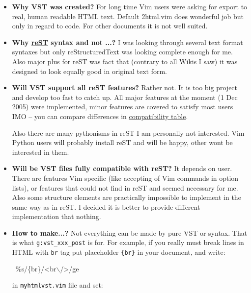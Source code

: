 \documentclass[12pt]{article}
\begin{document}
\begin{itemize}
\item
\textbf{Why VST was created?} For long time Vim users were asking for export
to real, human readable HTML text. Default 2html.vim does wonderful job but
only in regard to code. For other documents it is not well suited.

\item
\textbf{Why \href{http://docutils.sf.net}{reST} syntax and not ...?} I was looking through several text format
syntaxes but only reStructuredText was looking complete enough for me. Also
major plus for reST was fact that (contrary to all Wikis I saw) it was
designed to look equally good in original text form.

\item
\textbf{Will VST support all reST features?} Rather not. It is too big project
and develop too fast to catch up. All major features at the moment (1 Dec
2005) were implemented, minor features are covered to satisfy most users
IMO -- you can compare differences in \href{http://skawina.eu.org/mikolaj/restdiff.html}{compatibility table}.

 Also there are many pythonisms in reST I am personally not interested. Vim
 Python users will probably install reST and will be happy, other wont be
 interested in them.

\item
\textbf{Will be VST files fully compatible with reST?} It depends on user. There
are features Vim specific (like accepting of Vim commands in option lists),
or features that could not find in reST and seemed necessary for me. Also
some structure elements are practically impossible to implement in the same
way as in reST. I decided it is better to provide different implementation
that nothing.

\item
\textbf{How to make...?} Not everything can be made by pure VST or syntax. That
is what \texttt{g:vst\_xxx\_post} is for. For example, if you really must break
lines in HTML with \texttt{br} tag put placeholder \texttt{\{br\}} in your document,
and write:

\begin{ttfamily}\begin{flushleft}
\mbox{~\%s/\{br\}/<br$\backslash$/>/ge}\\
\end{flushleft}\end{ttfamily}

 in \texttt{myhtmlvst.vim} file and set:


\end{itemize}
\end{document}
